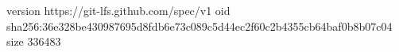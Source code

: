 version https://git-lfs.github.com/spec/v1
oid sha256:36e328be430987695d8fdb6e73c089c5d44ec2f60c2b4355cb64baf0b8b07c04
size 336483
